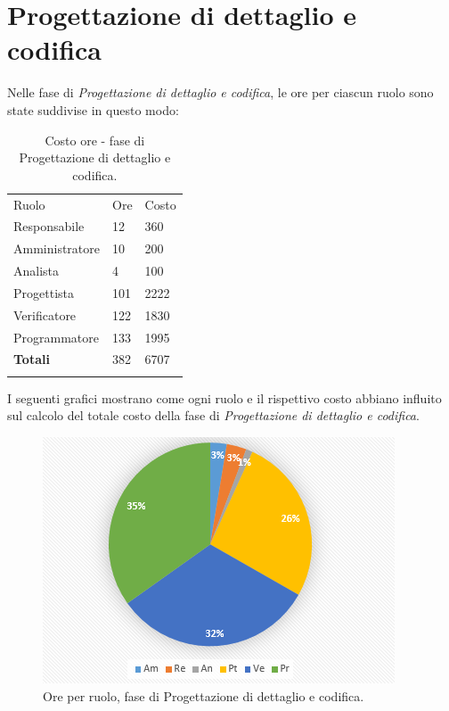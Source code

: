 \documentclass[a4paper]{report}
\begin{document}
		\section{Progettazione di dettaglio e codifica}
			Nelle fase di \emph{Progettazione di dettaglio e codifica}, le ore per ciascun ruolo sono state suddivise in questo modo:
			\begin{table}[H]
				\begin{tabularx}{\textwidth}{Y Y Y}
					Ruolo & Ore & Costo \\
					Responsabile & 12 & 360 \\
					Amministratore & 10 & 200 \\
					Analista & 4 & 100\\
					Progettista & 101 & 2222\\
					Verificatore & 122 & 1830\\
					Programmatore & 133 & 1995 \\
					\textbf{Totali} & 382 & 6707 \\
				\end{tabularx}
				\caption{Costo ore - fase di Progettazione di dettaglio e codifica. }
				\label{TCCodifica}
			\end{table}
			I seguenti grafici mostrano come ogni ruolo e il rispettivo costo abbiano influito sul calcolo del totale 
			costo della fase di \emph{Progettazione di dettaglio e codifica}.
			\begin{figure}[H]
				\centering
				\includegraphics[scale=0.7]{PCCodifica}
				\caption{Ore per ruolo, fase di Progettazione di dettaglio e codifica.}
			\end{figure}
\end{document}
